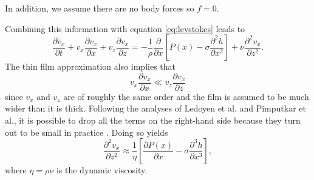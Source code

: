 \documentclass[aps, prl, twocolumn, groupedaddress]{revtex4-1}
\begin{document}
In addition, we assume there are no body forces so $f=0$.

Combining this information with equation \ref{eq:levstokes} leads to
\begin{equation}
  \frac{\partial v_x}{\partial t}+v_x\frac{\partial v_x}{\partial x} +v_z\frac{\partial
                                                                                                                                                                                                                                                                                                                                                                                                                                                                                                                                v_x}{\partial z} = - \frac{1}{\rho}\frac{\partial}{\partial
                                                                                                                                                                                                                                                                                                                                                                                                                                                                                                                                x}\left[P(x)-\sigma\frac{\partial^2 h}{\partial x^2}\right]+\nu\frac{\partial^2
                                                                                                                                                                                                                                                                                                                                                                                                                                                                                                                                v_x}{\partial z^2} \mathrm{.} \label{eq:lastfluid}
\end{equation}
The thin film approximation also implies that
\begin{equation}
v_x\frac{\partial v_x}{\partial x} \ll v_z\frac{\partial v_x}{\partial z}
\end{equation}
since $v_x$ and $v_z$ are of roughly the same order and the film is
assumed to be much wider than it is thick. Following the
analyses of Ledoyen et al. and Pimputkar et al., it is possible to
drop all the terms on the right-hand side because they turn out to be
small in practice \cite{ledoyen, pimputkar, barrett}. Doing so yields
\begin{equation}
\frac{\partial^2 v_x}{\partial z^2} \approx \frac{1}{\eta}\left[\frac{\partial
P(x)}{\partial x}-\sigma\frac{\partial^3 h}{\partial x^3}\right] \mathrm{,}
\label{eq:start}
\end{equation}
where $\eta= \rho\nu$ is the dynamic viscosity.
\end{document}
